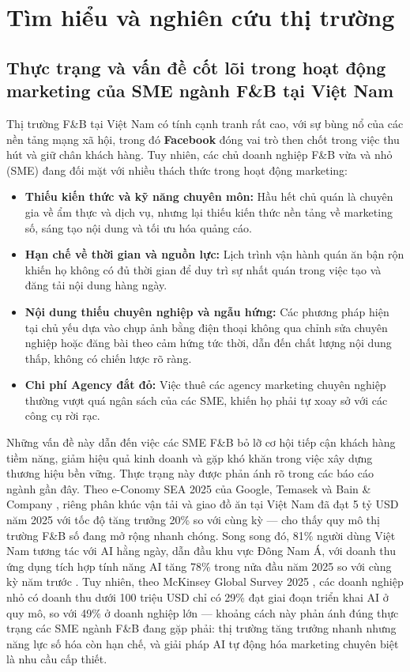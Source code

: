 \chapter{Tìm hiểu và nghiên cứu thị trường}\label{chap:thị-truong}

\section{Thực trạng và vấn đề cốt lõi trong hoạt động marketing của
SME ngành F\&B tại Việt Nam}\label{sec:thuc-trang}

Thị trường F\&B tại Việt Nam có tính cạnh tranh rất cao, với sự bùng nổ
của các nền tảng mạng xã hội, trong đó \textbf{Facebook} đóng vai trò
then chốt trong việc thu hút và giữ chân khách hàng. Tuy nhiên, các chủ
doanh nghiệp F\&B vừa và nhỏ (SME) đang đối mặt với nhiều thách thức
trong hoạt động marketing:

\begin{itemize}
\item
  \textbf{Thiếu kiến thức và kỹ năng chuyên môn:} Hầu hết chủ quán là
  chuyên gia về ẩm thực và dịch vụ, nhưng lại thiếu kiến thức nền tảng
  về marketing số, sáng tạo nội dung và tối ưu hóa quảng cáo.
\item
  \textbf{Hạn chế về thời gian và nguồn lực:} Lịch trình vận hành quán
  ăn bận rộn khiến họ không có đủ thời gian để duy trì sự nhất quán
  trong việc tạo và đăng tải nội dung hàng ngày.
\item
  \textbf{Nội dung thiếu chuyên nghiệp và ngẫu hứng:} Các phương pháp
  hiện tại chủ yếu dựa vào chụp ảnh bằng điện thoại không qua chỉnh sửa
  chuyên nghiệp hoặc đăng bài theo cảm hứng tức thời, dẫn đến chất lượng
  nội dung thấp, không có chiến lược rõ ràng.
\item
  \textbf{Chi phí Agency đắt đỏ:} Việc thuê các agency marketing chuyên
  nghiệp thường vượt quá ngân sách của các SME, khiến họ phải tự xoay sở
  với các công cụ rời rạc.
\end{itemize}

Những vấn đề này dẫn đến việc các SME F\&B bỏ lỡ cơ hội tiếp cận khách
hàng tiềm năng, giảm hiệu quả kinh doanh và gặp khó khăn trong việc xây
dựng thương hiệu bền vững. Thực trạng này được phản ánh rõ trong các báo
cáo ngành gần đây. Theo
e-Conomy SEA 2025 của Google, Temasek và Bain \& Company
, riêng phân khúc vận tải và giao đồ ăn tại Việt Nam
đã đạt 5 tỷ USD năm 2025 với tốc độ tăng trưởng 20\% so với cùng kỳ ---
cho thấy quy mô thị trường F\&B số đang mở rộng nhanh chóng. Song song
đó, 81\% người dùng Việt Nam tương tác với AI hằng ngày, dẫn đầu khu
vực Đông Nam Á, với doanh thu ứng dụng tích hợp tính năng AI tăng 78\%
trong nửa đầu năm 2025 so với cùng kỳ năm trước . Tuy
nhiên, theo McKinsey Global Survey 2025 , các doanh
nghiệp nhỏ có doanh thu dưới 100 triệu USD chỉ có 29\% đạt giai đoạn
triển khai AI ở quy mô, so với 49\% ở doanh nghiệp lớn --- khoảng cách
này phản ánh đúng thực trạng các SME ngành F\&B đang gặp phải: thị
trường tăng trưởng nhanh nhưng năng lực số hóa còn hạn chế, và giải pháp
AI tự động hóa marketing chuyên biệt là nhu cầu cấp thiết.

